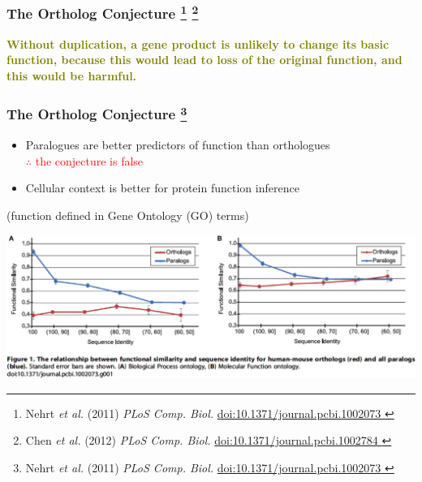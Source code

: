 
%
\begin{frame}
  \frametitle{The Ortholog Conjecture
    \footnote{\tiny{Nehrt \textit{et al.} (2011) \textit{PLoS Comp. Biol.} \href{http://dx.doi.org/10.1371/journal.pcbi.1002073}{doi:10.1371/journal.pcbi.1002073
    }}}  
    \footnote{\tiny{Chen \textit{et al.} (2012) \textit{PLoS Comp. Biol.} \href{http://dx.doi.org/10.1371/journal.pcbi.1002784}{doi:10.1371/journal.pcbi.1002784
    }}}  
  }
  \Large{
    \textcolor{olive}{
      \textbf{
      Without duplication, a gene product is unlikely to change its basic function, because this would lead to loss of the original function, and this would be harmful.
      }
    }
  }
\end{frame}

%
\begin{frame}
  \frametitle{The Ortholog Conjecture
    \footnote{\tiny{Nehrt \textit{et al.} (2011) \textit{PLoS Comp. Biol.} \href{http://dx.doi.org/10.1371/journal.pcbi.1002073}{doi:10.1371/journal.pcbi.1002073
    }}}  
  }
  \begin{itemize}
    \item Paralogues are better predictors of function than orthologues \\
      \textcolor{red}{$\therefore$ the conjecture is false}
    \item Cellular context is better for protein function inference
  \end{itemize}
  \textcolor{hutton_green}{(function defined in Gene Ontology (GO) terms)}
    \begin{center}
      \includegraphics[width=\textwidth]{images/nehrt_orthologues}      
    \end{center}  
\end{frame}

